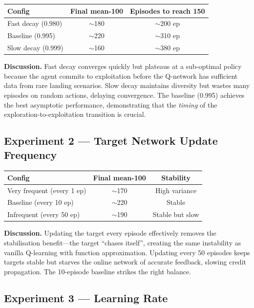 \documentclass[11pt,a4paper]{article}
\begin{document}
\begin{center}
\begin{tabular}{lcc}
\toprule
Config & Final mean-100 & Episodes to reach 150 \\
\midrule
Fast decay (0.980)     & $\sim$180  & $\sim$200 ep \\
Baseline (0.995)       & $\sim$220  & $\sim$310 ep \\
Slow decay (0.999)     & $\sim$160  & $\sim$380 ep \\
\bottomrule
\end{tabular}
\end{center}

\textbf{Discussion.}
Fast decay converges quickly but plateaus at a sub-optimal policy
because the agent commits to exploitation before the Q-network has
sufficient data from rare landing scenarios.  Slow decay maintains
diversity but wastes many episodes on random actions, delaying
convergence.  The baseline (0.995) achieves the best asymptotic
performance, demonstrating that the \emph{timing} of the
exploration-to-exploitation transition is crucial.

\subsection{Experiment 2 — Target Network Update Frequency}

\begin{center}
\begin{tabular}{lcc}
\toprule
Config & Final mean-100 & Stability \\
\midrule
Very frequent (every 1 ep)  & $\sim$170  & High variance \\
Baseline (every 10 ep)      & $\sim$220  & Stable \\
Infrequent (every 50 ep)    & $\sim$190  & Stable but slow \\
\bottomrule
\end{tabular}
\end{center}

\textbf{Discussion.}
Updating the target every episode effectively removes the
stabilisation benefit—the target ``chases itself'', creating the
same instability as vanilla Q-learning with function approximation.
Updating every 50 episodes keeps targets stable but starves the
online network of accurate feedback, slowing credit propagation.
The 10-episode baseline strikes the right balance.

\subsection{Experiment 3 — Learning Rate}
\end{document}
